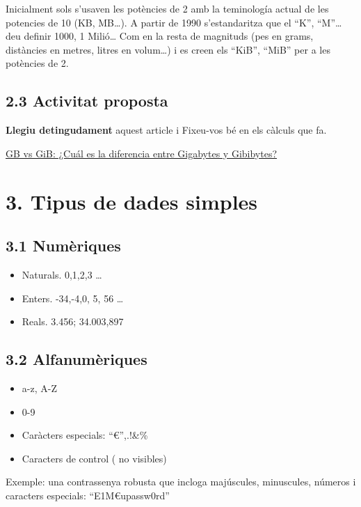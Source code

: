 \documentclass[
  12 pt,
  a4paper,
]{article}
\providecommand{\tightlist}{%
  \setlength{\itemsep}{0pt}\setlength{\parskip}{0pt}}
\begin{document}
Inicialment sols s'usaven les potències de 2 amb la teminología actual
de les potencies de 10 (KB, MB\ldots). A partir de 1990 s'estandaritza
que el ``K'', ``M''\ldots{} deu definir 1000, 1 Milió\ldots{} Com en la
resta de magnituds (pes en grams, distàncies en metres, litres en
volum\ldots) i es creen els ``KiB'', ``MiB'' per a les potències de 2.

\subsection{2.3 Activitat proposta}\label{activitat-proposta}

\textbf{Llegiu detingudament} aquest article i Fixeu-vos bé en els
càlculs que fa.

\href{https://massive.io/es/transferencia-de-archivos/gb-vs-gib/\#how-did-gibs-come-to-be}{GB
vs GiB: ¿Cuál es la diferencia entre Gigabytes y Gibibytes?}

\section{3. Tipus de dades simples}\label{tipus-de-dades-simples}

\subsection{3.1 Numèriques}\label{numuxe8riques}

\begin{itemize}
\tightlist
\item
  Naturals. 0,1,2,3 \ldots{}
\item
  Enters. -34,-4,0, 5, 56 \ldots{}
\item
  Reals. 3.456; 34.003,897
\end{itemize}

\subsection{3.2 Alfanumèriques}\label{alfanumuxe8riques}

\begin{itemize}
\tightlist
\item
  a-z, A-Z
\item
  0-9
\item
  Caràcters especials: ``€'',.!\&\%
\item
  Caracters de control ( no visibles)
\end{itemize}

Exemple: una contrassenya robusta que incloga majúscules, minuscules,
números i caracters especials: ``E1M€upassw0rd''
\end{document}
